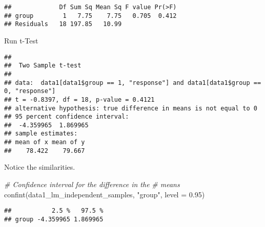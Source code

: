 \documentclass[
]{book}
\newenvironment{Shaded}{\begin{snugshade}}{\end{snugshade}}
\newcommand{\AttributeTok}[1]{\textcolor[rgb]{0.77,0.63,0.00}{#1}}
\newcommand{\CommentTok}[1]{\textcolor[rgb]{0.56,0.35,0.01}{\textit{#1}}}
\newcommand{\ConstantTok}[1]{\textcolor[rgb]{0.00,0.00,0.00}{#1}}
\newcommand{\DecValTok}[1]{\textcolor[rgb]{0.00,0.00,0.81}{#1}}
\newcommand{\FloatTok}[1]{\textcolor[rgb]{0.00,0.00,0.81}{#1}}
\newcommand{\FunctionTok}[1]{\textcolor[rgb]{0.00,0.00,0.00}{#1}}
\newcommand{\NormalTok}[1]{#1}
\newcommand{\SpecialCharTok}[1]{\textcolor[rgb]{0.00,0.00,0.00}{#1}}
\newcommand{\StringTok}[1]{\textcolor[rgb]{0.31,0.60,0.02}{#1}}
\begin{document}
\begin{verbatim}
##             Df Sum Sq Mean Sq F value Pr(>F)
## group        1   7.75    7.75   0.705  0.412
## Residuals   18 197.85   10.99
\end{verbatim}

Run t-Test

\begin{Shaded}
\end{Shaded}

\begin{verbatim}
## 
##  Two Sample t-test
## 
## data:  data1[data1$group == 1, "response"] and data1[data1$group == 0, "response"]
## t = -0.8397, df = 18, p-value = 0.4121
## alternative hypothesis: true difference in means is not equal to 0
## 95 percent confidence interval:
##  -4.359965  1.869965
## sample estimates:
## mean of x mean of y 
##    78.422    79.667
\end{verbatim}

Notice the similarities.

\begin{Shaded}
\begin{Highlighting}[]
\CommentTok{\# Confidence interval for the difference in the}
\CommentTok{\# means}
\FunctionTok{confint}\NormalTok{(data1\_lm\_independent\_samples, }\StringTok{"group"}\NormalTok{, }\AttributeTok{level =} \FloatTok{0.95}\NormalTok{)}
\end{Highlighting}
\end{Shaded}

\begin{verbatim}
##           2.5 %   97.5 %
## group -4.359965 1.869965
\end{verbatim}

\begin{Shaded}
\end{Shaded}
\end{document}
